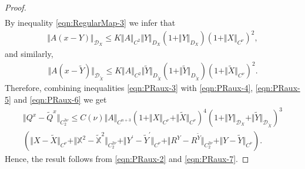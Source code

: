 \documentclass[11pt,a4paper,reqno]{amsart}%
\theoremstyle{plain}
\theoremstyle{remark}
\theoremstyle{plain}
\numberwithin{equation}{section}
\begin{document}
\begin{proof}
\begin{align}
\end{align}
By inequality \eqref{eqn:RegularMap-3} we infer that
\begin{eqnarray}
\Vert A(x-Y)\Vert_{\mathcal{D}_X}\leq
K\Vert A\Vert_{C^2}\Vert Y\Vert_{D_X}(1+\Vert Y\Vert_{D_X})(1+\Vert X\Vert_{C^{\nu}})^2,\label{eqn:PRaux-5}
\end{eqnarray}
and similarly,
\begin{eqnarray}
\Vert A(x-\tilde{Y})\Vert_{\mathcal{D}_{\tilde{X}}}\leq
K\Vert A\Vert_{C^2}\Vert \tilde{Y}\Vert_{D_{\tilde{X}}}(1+\Vert \tilde{Y}\Vert_{D_{\tilde{X}}})(1+\Vert \tilde{X}\Vert_{C^{\nu}})^2.\label{eqn:PRaux-6}
\end{eqnarray}
Therefore, combining inequalities \eqref{eqn:PRaux-3} with \eqref{eqn:PRaux-4},
\eqref{eqn:PRaux-5} and \eqref{eqn:PRaux-6} we get
\begin{multline}\label{eqn:PRaux-7}
\Vert Q^x-\tilde{Q}^x\Vert_{C_2^{3\nu}}\leq C(\nu)\Vert A\Vert_{C^{n+3}}(1+\Vert X\Vert_{C^{\nu}}+\Vert \tilde{X}\Vert_{C^{\nu}})^4(1+\Vert Y\Vert_{\mathcal{D}_X}+\Vert \tilde{Y}\Vert_{\mathcal{D}_{\tilde{X}}})^3\\
(\Vert X-\tilde{X}\Vert_{C^{\nu}}+\Vert \mathbb{X}^2-\mathbb{\tilde{X}}^2\Vert_{C_2^{2\nu}}+\Vert Y^\prime-\tilde{Y}^\prime\Vert_{C^{\nu}}+\Vert R^Y-R^{\tilde{Y}}\Vert_{C_2^{2\nu}}+\Vert Y-\tilde{Y}\Vert_{C^{\nu}}).
\end{multline}
Hence, the result follows from \eqref{eqn:PRaux-2} and
\eqref{eqn:PRaux-7}.
\end{proof}
\end{document}
